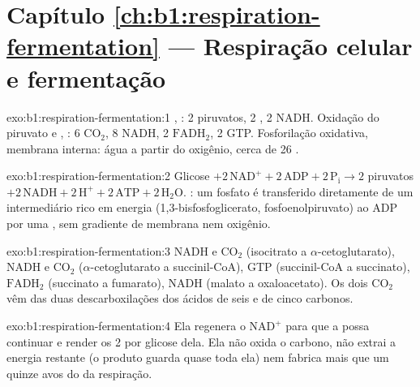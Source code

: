 \section*{Capítulo \ref{ch:b1:respiration-fermentation} --- Respiração celular e fermentação}

\begin{solution}{exo:b1:respiration-fermentation:1}
, : 2 piruvatos, 2 , 2 NADH. Oxidação do piruvato e
, : 6 $\mathrm{CO_2}$, 8 NADH, 2
$\mathrm{FADH_2}$, 2 GTP. Fosforilação oxidativa, membrana interna: água
a partir do oxigênio, cerca de 26 .
\end{solution}

\begin{solution}{exo:b1:respiration-fermentation:2}
Glicose $+ 2\,\mathrm{NAD^+} + 2\,\mathrm{ADP} + 2\,\mathrm{P_i} \to
2$ piruvatos $+ 2\,\mathrm{NADH} + 2\,\mathrm{H^+} + 2\,\mathrm{ATP} +
2\,\mathrm{H_2O}$. : um fosfato é
transferido diretamente de um intermediário rico em energia
(1,3-bisfosfoglicerato, fosfoenolpiruvato) ao ADP por uma , sem
gradiente de membrana nem oxigênio.
\end{solution}

\begin{solution}{exo:b1:respiration-fermentation:3}
NADH e $\mathrm{CO_2}$ (isocitrato a $\alpha$-cetoglutarato), NADH e
$\mathrm{CO_2}$ ($\alpha$-cetoglutarato a succinil-CoA), GTP
(succinil-CoA a succinato), $\mathrm{FADH_2}$ (succinato a fumarato),
NADH (malato a oxaloacetato). Os dois $\mathrm{CO_2}$ vêm das duas
descarboxilações dos ácidos de seis e de cinco carbonos.
\end{solution}

\begin{solution}{exo:b1:respiration-fermentation:4}
Ela regenera o $\mathrm{NAD^+}$ para que a  possa continuar e
render os 2  por glicose dela. Ela não oxida o carbono, não extrai a
energia restante (o produto guarda quase toda ela) nem fabrica mais que
um quinze avos do  da respiração.
\end{solution}

